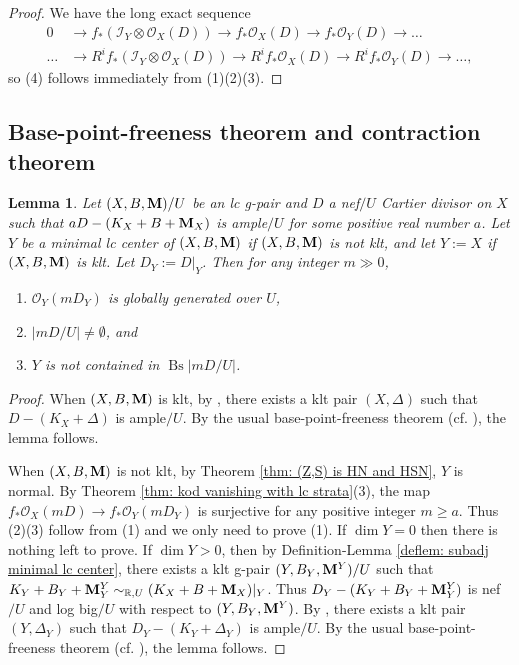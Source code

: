 \documentclass[11pt]{amsart}
\numberwithin{equation}{section}
\newcommand{\Mm}{{\bf{M}}}
\newcommand{\Rr}{\mathbb{R}}
\newcommand{\Bs}{{\operatorname{Bs}}}
\newtheorem{lem}[thm]{Lemma}
\theoremstyle{definition}
\theoremstyle{definition}
\theoremstyle{definition}
\begin{document}
\begin{proof}
We have the long exact sequence
\begin{align*}
    0&\rightarrow f_*(\mathcal{I}_Y\otimes \mathcal{O}_X(D))\rightarrow f_*\mathcal{O}_X(D)\rightarrow f_*\mathcal{O}_Y(D)\rightarrow\dots\\
    \dots&\rightarrow R^if_*(\mathcal{I}_Y\otimes \mathcal{O}_X(D))\rightarrow R^if_*\mathcal{O}_X(D)\rightarrow R^if_*\mathcal{O}_Y(D)\rightarrow\dots,
\end{align*}
so (4) follows immediately from (1)(2)(3).
\end{proof}



\subsection{Base-point-freeness theorem and contraction theorem}\label{subsec: bpf nonnqc}

\begin{lem}\label{lem: non-vanishing of lc gpair}
 Let $(X,B,\Mm)/U$ be an lc g-pair and $D$ a nef$/U$ Cartier divisor on $X$ such that $aD-(K_X+B+\Mm_X)$ is ample$/U$ for some positive real number $a$. Let $Y$ be a minimal lc center of $(X,B,\Mm)$ if $(X,B,\Mm)$ is not klt, and let $Y:=X$ if $(X,B,\Mm)$ is klt. Let $D_Y:=D|_Y$. Then for any integer $m\gg 0$,
\begin{enumerate}
    \item  $\mathcal{O}_{Y}(mD_Y)$ is globally generated over $U$,
    \item  $|mD/U|\not=\emptyset$, and
    \item $Y$ is not contained in $\Bs|mD/U|$.
\end{enumerate}
\end{lem}
\begin{proof}
When $(X,B,\Mm)$ is klt, by \cite[Lemma 3.4]{HL22}, there exists a klt pair $(X,\Delta)$ such that $D-(K_X+\Delta)$ is ample$/U$. By the usual base-point-freeness theorem (cf. \cite[Theorem 3-1-1]{KMM87}), the lemma follows.

When $(X,B,\Mm)$ is not klt, by Theorem \ref{thm: (Z,S) is HN and HSN}, $Y$ is normal. By Theorem \ref{thm: kod vanishing with lc strata}(3), the map $f_*\mathcal{O}_X(mD)\rightarrow f_*\mathcal{O}_Y(mD_Y)$ is surjective for any positive integer $m\geq a$. Thus (2)(3) follow from (1) and we only need to prove (1). If $\dim Y=0$ then there is nothing left to prove. If $\dim Y>0$, then by  Definition-Lemma \ref{deflem: subadj minimal lc center}, there exists a klt g-pair $(Y,B_Y,\Mm^{Y})/U$ such that $K_{Y}+B_{Y}+\Mm^{Y}_{Y}\sim_{\Rr,U}(K_X+B+\Mm_X)|_{Y}$. Thus $D_Y-(K_{Y}+B_{Y}+\Mm^{Y}_{Y})$ is nef$/U$ and log big$/U$ with respect to $(Y,B_Y,\Mm^Y)$. By \cite[Lemma 3.4]{HL22}, there exists a klt pair $(Y,\Delta_Y)$ such that $D_Y-(K_Y+\Delta_Y)$ is ample$/U$. By the usual base-point-freeness theorem (cf. \cite[Theorem 3-1-1]{KMM87}), the lemma follows.
\end{proof}
\end{document}
